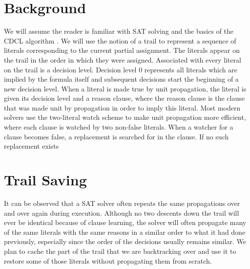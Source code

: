 \documentclass{article}
\begin{document}
\section{Background}
We will assume the reader is familiar with SAT solving and the basics of the CDCL algorithm \cite{DBLP:series/faia/SilvaLM09}. We will use the notion of a trail to represent a sequence of literals corresponding to the current partial assignment. The literals appear on the trail in the order in which they were assigned. Associated with every literal on the trail is a decision level. Decision level 0 represents all literals which are implied by the formula itself and subsequent decisions start the beginning of a new decision level. When a literal is made true by unit propagation, the literal is given its decision level and a reason clause, where the reason clause is the clause that was made unit by propagation in order to imply this literal. Most modern solvers use the two-literal watch scheme to make unit propagation more efficient, where each clause is watched by two non-false literals. When a watcher for a clause becomes false, a replacement is searched for in the clause. If no such replacement exists

\section{Trail Saving}
It can be observed that a SAT solver often repeats the same propagations over and over again during execution. Although no two descents down the trail will ever be identical because of clause learning, the solver will often propagate many of the same literals with the same reasons in a similar order to what it had done previously, especially since the order of the decisions usually remains similar. We plan to cache the part of the trail that we are backtracking over and use it to restore some of those literals without propagating them from scratch.
\end{document}
